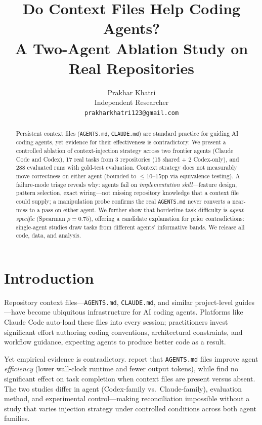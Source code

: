 \documentclass[11pt]{article}
\title{Do Context Files Help Coding Agents?\\A Two-Agent Ablation Study on Real Repositories}
\author{Prakhar Khatri \\ Independent Researcher \\ \texttt{prakharkhatri123@gmail.com}}
\newcommand{\agentsmd}{\texttt{AGENTS.md}}
\begin{document}
\maketitle

\begin{abstract}
Persistent context files (\agentsmd{}, \texttt{CLAUDE.md}) are standard practice for guiding AI coding agents, yet evidence for their effectiveness is contradictory.
We present a controlled ablation of context-injection strategy across two frontier agents (Claude Code and Codex), 17 real tasks from 3 repositories (15 shared + 2 Codex-only), and 288 evaluated runs with gold-test evaluation.
Context strategy does not measurably move correctness on either agent (bounded to ${\leq}10$--$15$pp via equivalence testing).
A failure-mode triage reveals why: agents fail on \emph{implementation skill}---feature design, pattern selection, exact wiring---not missing repository knowledge that a context file could supply; a manipulation probe confirms the real \agentsmd{} never converts a near-miss to a pass on either agent.
We further show that borderline task difficulty is \emph{agent-specific} (Spearman $\rho{=}0.75$), offering a candidate explanation for prior contradictions: single-agent studies draw tasks from different agents' informative bands.
We release all code, data, and analysis.
\end{abstract}

\section{Introduction}

Repository context files---\agentsmd{}, \texttt{CLAUDE.md}, and similar project-level guides---have become ubiquitous infrastructure for AI coding agents.
Platforms like Claude Code auto-load these files into every session; practitioners invest significant effort authoring coding conventions, architectural constraints, and workflow guidance, expecting agents to produce better code as a result.

Yet empirical evidence is contradictory.
\citet{paper1} report that \agentsmd{} files improve agent \emph{efficiency} (lower wall-clock runtime and fewer output tokens), while \citet{paper2} find no significant effect on task completion when context files are present versus absent.
The two studies differ in agent (Codex-family vs.\ Claude-family), evaluation method, and experimental control---making reconciliation impossible without a study that varies injection strategy under controlled conditions across both agent families.
\end{document}
